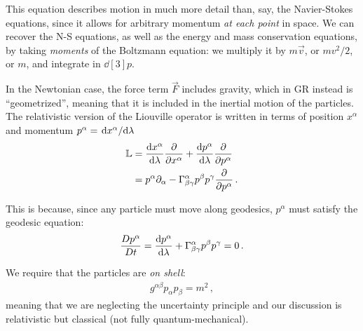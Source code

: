\documentclass[main.tex]{subfiles}
\begin{document}
This equation describes motion in much more detail than, say, the Navier-Stokes equations, since it allows for arbitrary momentum \emph{at each point} in space. 
We can recover the N-S equations, as well as the energy and mass conservation equations, by taking \emph{moments} of the Boltzmann equation: we multiply it by \(m \vec{v}\), or \(m v^2 / 2\), or \(m\), and integrate in \(\dd[3]{p}\).

In the Newtonian case, the force term \(\vec{F}\) includes gravity, which in GR instead is ``geometrized'', meaning that it is included in the inertial motion of the particles. 
The relativistic version of the Liouville operator is written in terms of position \(x^{\alpha }\) and momentum \(p^{\alpha } = \dv*{x^{\alpha }}{\lambda }\)
%
\begin{align}
\mathbb{L} 
&= \dv{x^{\alpha }}{\lambda } \pdv{}{x^{\alpha }} 
+ \dv{p^{\alpha }}{\lambda } \pdv{}{p^{\alpha }} \\ 
&= p^{\alpha } \partial_{\alpha } - \Gamma^{\alpha }_{\beta \gamma } p^{\beta } p^{\gamma } \pdv{}{p^{\alpha }}
\,.
\end{align}


This is because, since any particle must move along geodesics, \(p^{\alpha }\) must satisfy the geodesic equation: 
%
\begin{align}
\frac{Dp^{\alpha }}{Dt } =
\dv{p^{\alpha }}{\lambda } + \Gamma^{\alpha }_{\beta \gamma } p^{\beta } p^{\gamma }=0
\,.
\end{align}

We require that the particles are \emph{on shell}:
%
\begin{align}
  g^{\alpha \beta } p_{\alpha } p_{\beta } = m^2
\,,
\end{align}
%
meaning that we are neglecting the uncertainty principle and our discussion is relativistic but classical (not fully quantum-mechanical).

\end{document}
